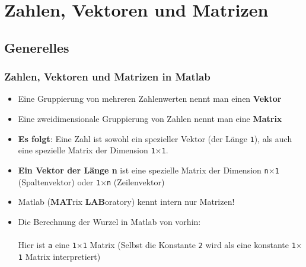     \section{Zahlen, Vektoren und Matrizen}

    \subsection{Generelles}
    \begin{frame}
      \frametitle{Zahlen, Vektoren und Matrizen in Matlab}
      \begin{itemize}
          \item Eine Gruppierung von mehreren Zahlenwerten nennt man einen \textbf{Vektor}
          \item Eine zweidimensionale Gruppierung von Zahlen nennt man eine \textbf{Matrix}
          \item \textbf{Es folgt}: Eine Zahl ist sowohl ein spezieller Vektor (der Länge \texttt{1}), als auch eine spezielle Matrix der Dimension \texttt{1$\times$1}.
          \item \textbf{Ein Vektor der Länge n} ist eine spezielle Matrix der Dimension \texttt{n$\times$1} (Spaltenvektor) oder \texttt{1$\times$n} (Zeilenvektor)
          \item Matlab (\textbf{MAT}rix \textbf{LAB}oratory) kennt intern nur Matrizen!
          \item Die Berechnung der Wurzel in Matlab von vorhin: \\
           \\
          Hier ist \texttt{a} eine \texttt{1$\times$1} Matrix (Selbst die Konstante \texttt{2} wird als eine konstante \texttt{1$\times$1} Matrix interpretiert)
      \end{itemize}
    \end{frame}

